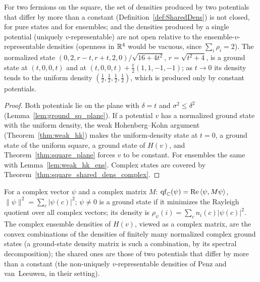 \begin{theorem}
  \label{thm:square_shared_dens}
  \leanok
  For two fermions on the square, the set of densities produced by two potentials that differ by more than a constant
  (Definition~\ref{def:SharedDens}) is not closed, for pure
  states and for ensembles; and the densities produced by a single potential (uniquely $v$-representable)
  are not open relative to the ensemble-$v$-representable densities (openness in $\mathbb{R}^4$ would be vacuous,
  since $\sum_i\rho_i=2$). The
  normalized state $(0,2,r-t,r+t,2,0)/\sqrt{16+4t^2}$, $r=\sqrt{t^2+4}$, is a ground state at $(t,0,0,t)$ and at
  $(t,0,0,t)+\tfrac t2(1,1,-1,-1)$; as $t\to0$ its density tends to the uniform density $(\tfrac12,\tfrac12,\tfrac12,
  \tfrac12)$, which is produced only by constant potentials.
\end{theorem}
\begin{proof}
  \leanok
  Both potentials lie on the plane with $\delta=t$ and $\sigma^2\le\delta^2$ (Lemma~\ref{lem:ground_sq_plane}). If a
  potential $v$ has a normalized ground state with the uniform density, the weak Hohenberg--Kohn argument
  (Theorem~\ref{thm:weak_hk}) makes the uniform-density state at $t=0$, a ground state of the uniform square, a ground
  state of $H(v)$, and Theorem~\ref{thm:square_plane} forces $v$ to be constant. For ensembles the same with
  Lemma~\ref{lem:weak_hk_ens}. Complex states are covered by Theorem~\ref{thm:square_shared_dens_complex}.
\end{proof}

\begin{definition}
  \label{def:EnsDensC}
  \leanok
  For a complex vector $\psi$ and a complex matrix $M$: $\operatorname{qf}_{\mathbb{C}}(\psi)=\mathrm{Re}\,\langle\psi,M\psi\rangle$,
  $\|\psi\|^2=\sum_c|\psi(c)|^2$; $\psi\neq0$ is a ground state if it minimizes the Rayleigh quotient over all complex
  vectors; its density is $\rho_\psi(i)=\sum_c n_i(c)|\psi(c)|^2$. The complex ensemble densities of $H(v)$, viewed
  as a complex matrix, are the convex combinations of the densities of finitely many normalized complex ground
  states (a ground-state density matrix is such a combination, by its spectral decomposition); the shared ones are
  those of two potentials that differ by more than a constant (the non-uniquely $v$-representable densities of Penz
  and van~Leeuwen, in their setting).
\end{definition}

